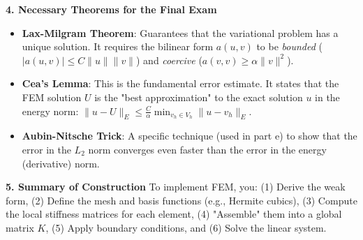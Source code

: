 \begin{remark}
\textbf{4. Necessary Theorems for the Final Exam}
\begin{itemize}
    \item \textbf{Lax-Milgram Theorem}: Guarantees that the variational problem has a unique solution. It requires the bilinear form $a(u, v)$ to be \textit{bounded} ($|a(u, v)| \leq C \|u\| \|v\|$) and \textit{coercive} ($a(v, v) \geq \alpha \|v\|^2$).
    \item \textbf{Cea's Lemma}: This is the fundamental error estimate. It states that the FEM solution $U$ is the "best approximation" to the exact solution $u$ in the energy norm: $\|u - U\|_E \leq \frac{C}{\alpha} \min_{v_h \in V_h} \|u - v_h\|_E$. 
    \item \textbf{Aubin-Nitsche Trick}: A specific technique (used in part e) to show that the error in the $L_2$ norm converges even faster than the error in the energy (derivative) norm.
\end{itemize}

\textbf{5. Summary of Construction}
To implement FEM, you: (1) Derive the weak form, (2) Define the mesh and basis functions (e.g., Hermite cubics), (3) Compute the local stiffness matrices for each element, (4) "Assemble" them into a global matrix $K$, (5) Apply boundary conditions, and (6) Solve the linear system.
\end{remark}
